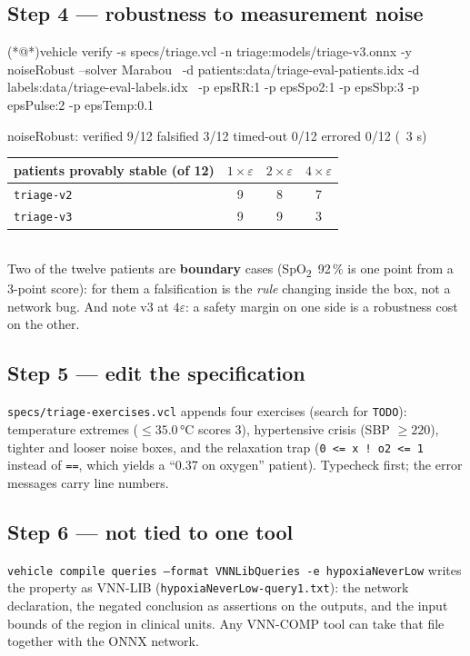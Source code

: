 \documentclass[11pt]{article}
\begin{document}
\subsection*{Step 4 — robustness to measurement noise}
\begin{shellbox}
(*@\tprompt@*)vehicle verify -s specs/triage.vcl -n triage:models/triage-v3.onnx -y noiseRobust --solver Marabou \
   -d patients:data/triage-eval-patients.idx -d labels:data/triage-eval-labels.idx \
   -p epsRR:1 -p epsSpo2:1 -p epsSbp:3 -p epsPulse:2 -p epsTemp:0.1
\end{shellbox}
\begin{expected}
noiseRobust:  verified 9/12   falsified 3/12   timed-out 0/12   errored 0/12         (~3 s)
\end{expected}
\begin{tabularx}{\textwidth}{@{}Xccc@{}}
\toprule
patients provably stable (of 12) & $1\times\varepsilon$ & $2\times\varepsilon$ & $4\times\varepsilon$\\
\midrule
\texttt{triage-v2} & 9 & 8 & 7\\
\texttt{triage-v3} & 9 & 9 & 3\\
\bottomrule
\end{tabularx}\\[1mm]
Two of the twelve patients are \textbf{boundary} cases (SpO\textsubscript{2}~92\,\% is one point from a 3-point score): for them a falsification is the \emph{rule} changing inside the box, not a network bug. And note v3 at $4\varepsilon$: a safety margin on one side is a robustness cost on the other.

\subsection*{Step 5 — edit the specification}
\texttt{specs/triage-exercises.vcl} appends four exercises (search for \texttt{TODO}): temperature extremes ($\le 35.0$\,°C scores 3), hypertensive crisis (SBP $\ge 220$), tighter and looser noise boxes, and the relaxation trap (\texttt{0 <= x ! o2 <= 1} instead of \texttt{==}, which yields a ``0.37 on oxygen'' patient). Typecheck first; the error messages carry line numbers.

\subsection*{Step 6 — not tied to one tool}
\texttt{vehicle compile queries --format VNNLibQueries -e hypoxiaNeverLow} writes the property as VNN-LIB (\texttt{hypoxiaNeverLow-query1.txt}): the network declaration, the negated conclusion as assertions on the outputs, and the input bounds of the region in clinical units. Any VNN-COMP tool can take that file together with the ONNX network.
\end{document}
